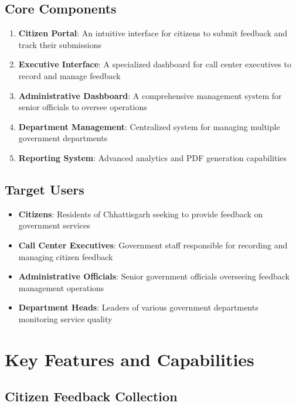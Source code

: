 \documentclass[12pt,a4paper]{article}
\begin{document}
\subsection{Core Components}

\begin{enumerate}[leftmargin=2em]
    \item \textbf{Citizen Portal}: An intuitive interface for citizens to submit feedback and track their submissions
    \item \textbf{Executive Interface}: A specialized dashboard for call center executives to record and manage feedback
    \item \textbf{Administrative Dashboard}: A comprehensive management system for senior officials to oversee operations
    \item \textbf{Department Management}: Centralized system for managing multiple government departments
    \item \textbf{Reporting System}: Advanced analytics and PDF generation capabilities
\end{enumerate}

\subsection{Target Users}

\begin{itemize}[leftmargin=2em]
    \item \textbf{Citizens}: Residents of Chhattisgarh seeking to provide feedback on government services
    \item \textbf{Call Center Executives}: Government staff responsible for recording and managing citizen feedback
    \item \textbf{Administrative Officials}: Senior government officials overseeing feedback management operations
    \item \textbf{Department Heads}: Leaders of various government departments monitoring service quality
\end{itemize}

\section{Key Features and Capabilities}

\subsection{Citizen Feedback Collection}
\end{document}
